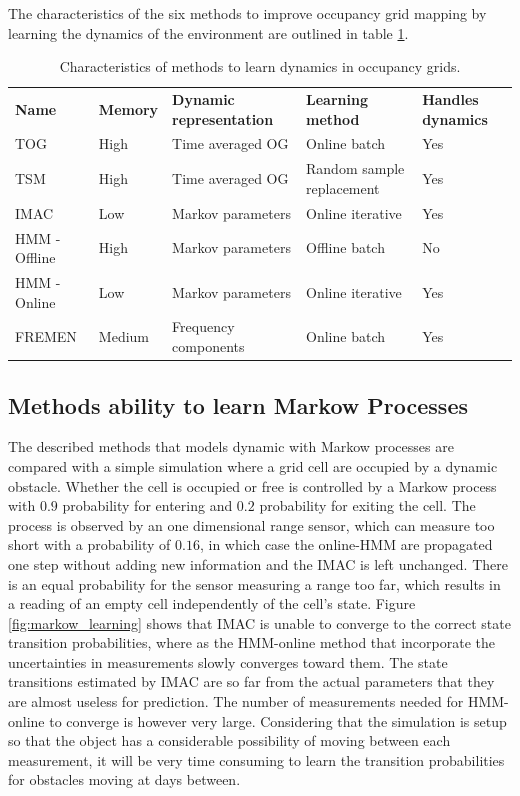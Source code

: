 The characteristics of the six methods to improve occupancy grid mapping by learning the dynamics of the environment are outlined in table \ref{tab:learners_characteristics}.

\begin{table}[htbp]
    \centering
    \caption{Characteristics of methods to learn dynamics in occupancy grids.}
    \label{tab:learners_characteristics}
    \begin{tabular}{p{2.6cm} | p{1.6cm} | p{} | p{2.6cm} | p{1.6cm}}
        \toprule
        \textbf{Name} & \textbf{Memory} & \textbf{Dynamic representation} & \textbf{Learning method} & \textbf{Handles dynamics} \\
        \rowcolor[gray]{0.925}
        TOG & High & Time averaged OG & Online batch & Yes \\
        TSM & High & Time  averaged OG & Random sample replacement  & Yes\\
        \rowcolor[gray]{0.925}
        IMAC & Low & Markov parameters & Online iterative & Yes \\
        HMM - Offline & High & Markov parameters & Offline batch  & No \\
        \rowcolor[gray]{0.925} 
        HMM - Online & Low & Markov parameters & Online iterative & Yes \\
        FREMEN & Medium & Frequency components & Online batch & Yes\\
        \bottomrule
    \end{tabular}
\end{table}

\subsection{Methods ability to learn Markow Processes}
The described methods that models dynamic with Markow processes are compared with a simple simulation where a grid cell are occupied by a dynamic obstacle. 
Whether the cell is occupied or free is controlled by a Markow process with $0.9$ probability for entering and $0.2$ probability for exiting the cell. 
The process is observed by an one dimensional range sensor, which can measure too short with a probability of $0.16$, in which case the online-HMM are propagated one step without adding new information and the IMAC is left unchanged.
There is an equal probability for the sensor measuring a range too far, which results in a reading of an empty cell independently of the cell's state. 
Figure \ref{fig:markow_learning} shows that IMAC is unable to converge to the correct state transition probabilities, where as the HMM-online method that incorporate the uncertainties in measurements slowly converges toward them.
The state transitions estimated by IMAC are so far from the actual parameters that they are almost useless for prediction. 
The number of measurements needed for HMM-online to converge is however very large.
Considering that the simulation is setup so that the object has a considerable possibility of moving between each measurement, it will be very time consuming to learn the transition probabilities for obstacles moving at days between.

